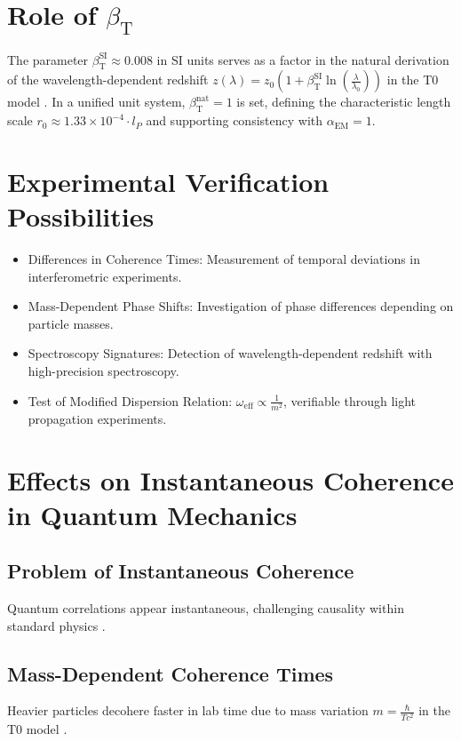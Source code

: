 \documentclass[12pt,a4paper]{article}
\newcommand{\betaT}{\beta_{\text{T}}}
\newcommand{\alphaEM}{\alpha_{\text{EM}}}
\begin{document}
	\section{Role of \(\betaT\)}
	The parameter \(\betaT^{\text{SI}} \approx 0.008\) in SI units serves as a factor in the natural derivation of the wavelength-dependent redshift \( z(\lambda) = z_0 \left(1 + \betaT^{\text{SI}} \ln\left(\frac{\lambda}{\lambda_0}\right)\right) \) in the T0 model \cite{pascher_alphabeta_2025}. In a unified unit system, \(\betaT^{\text{nat}} = 1\) is set, defining the characteristic length scale \( r_0 \approx 1.33 \times 10^{-4} \cdot l_P \) and supporting consistency with \(\alphaEM = 1\).
	
	\section{Experimental Verification Possibilities}
	\begin{itemize}
		\item Differences in Coherence Times: Measurement of temporal deviations in interferometric experiments.
		\item Mass-Dependent Phase Shifts: Investigation of phase differences depending on particle masses.
		\item Spectroscopy Signatures: Detection of wavelength-dependent redshift with high-precision spectroscopy.
		\item Test of Modified Dispersion Relation: \( \omega_{\text{eff}} \propto \frac{1}{m^2} \), verifiable through light propagation experiments.
	\end{itemize}
	
	\section{Effects on Instantaneous Coherence in Quantum Mechanics}
	\subsection{Problem of Instantaneous Coherence}
	Quantum correlations appear instantaneous, challenging causality within standard physics \cite{bell}.
	
	\subsection{Mass-Dependent Coherence Times}
	Heavier particles decohere faster in lab time due to mass variation \( m = \frac{\hbar}{T c^2} \) in the T0 model \cite{pascher_galaxies_2025}.
	
\end{document}
